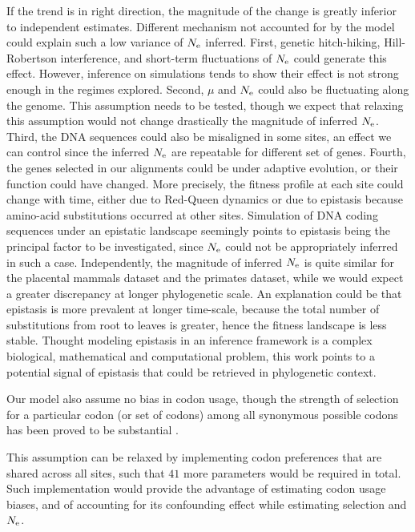 If the trend is in right direction, the magnitude of the change is greatly inferior to independent estimates.
Different mechanism not accounted for by the model could explain such a low variance of $N_{\mathrm{e}}$ inferred.
First, genetic hitch-hiking, Hill-Robertson interference, and short-term fluctuations of $N_{\mathrm{e}}$ could generate this effect.
However, inference on simulations tends to show their effect is not strong enough in the regimes explored.
Second, $\mu$ and $N_{\mathrm{e}}$ could also be fluctuating along the genome.
This assumption needs to be tested, though we expect that relaxing this assumption would not change drastically the magnitude of inferred $N_{\mathrm{e}}$.
Third, the DNA sequences could also be misaligned in some sites, an effect we can control since the inferred $N_{\mathrm{e}}$ are repeatable for different set of genes.
Fourth, the genes selected in our alignments could be under adaptive evolution, or their function could have changed.
More precisely, the fitness profile at each site could change with time, either due to Red-Queen dynamics or due to epistasis because amino-acid substitutions occurred at other sites.
Simulation of DNA coding sequences under an epistatic landscape seemingly points to epistasis being the principal factor to be investigated, since $N_{\mathrm{e}}$ could not be appropriately inferred in such a case.
Independently, the magnitude of inferred $N_{\mathrm{e}}$ is quite similar for the placental mammals dataset and the primates dataset, while we would expect a greater discrepancy at longer phylogenetic scale.
An explanation could be that epistasis is more prevalent at longer time-scale, because the total number of substitutions from root to leaves is greater, hence the fitness landscape is less stable.
Thought modeling epistasis in an inference framework is a complex biological, mathematical and computational problem, this work points to a potential signal of epistasis that could be retrieved in phylogenetic context.

Our model also assume no bias in codon usage, though the strength of selection for a particular codon (or set of codons) among all synonymous possible codons has been proved to be substantial \citep{Plotkin2011}.

This assumption can be relaxed by implementing codon preferences that are shared across all sites, such that $41$ more parameters would be required in total.
Such implementation would provide the advantage of estimating codon usage biases, and of accounting for its confounding effect while estimating selection and $N_{\mathrm{e}}$.

